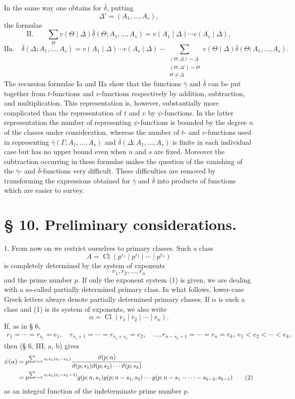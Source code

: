 \documentclass[11pt,a4paper]{article}
\newcommand{\Cl}{\operatorname{Cl}}
\begin{document}
In the same way one obtains for $\bar\delta$, putting
\[
 \Delta'=(A_1,\ldots,A_s),
\]
the formulae
\[
\text{II.}\qquad
 \sum_{\Theta}v(\Theta\mid\Delta)\bar\delta(\Theta;A_1,\ldots,A_s)
 =v(A_1\mid\Delta)\cdots v(A_s\mid\Delta),
\]
\[
\text{IIa.}\quad
 \bar\delta(\Delta;A_1,\ldots,A_s)=v(A_1\mid\Delta)\cdots v(A_s\mid\Delta)
 -\sum_{\substack{(\Theta,\Delta)=\Delta\\(\Theta,\Delta')=\Theta\\\Theta\ne\Delta}}
 v(\Theta\mid\Delta)\bar\delta(\Theta;A_1,\ldots,A_s).
\]
The recursion formulae Ia and IIa show that the functions $\bar\gamma$ and $\bar\delta$ can be put together from $t$-functions and $v$-functions respectively by addition, subtraction, and multiplication. This representation is, however, substantially more complicated than the representation of $t$ and $v$ by $\psi$-functions. In the latter representation the number of representing $\psi$-functions is bounded by the degree $n$ of the classes under consideration, whereas the number of $t$- and $v$-functions used in representing $\bar\gamma(\Gamma;A_1,\ldots,A_s)$ and $\bar\delta(\Delta;A_1,\ldots,A_s)$ is finite in each individual case but has no upper bound even when $n$ and $s$ are fixed. Moreover the subtraction occurring in these formulae makes the question of the vanishing of the $\bar\gamma$- and $\bar\delta$-functions very difficult. These difficulties are removed by transforming the expressions obtained for $\bar\gamma$ and $\bar\delta$ into products of functions which are easier to survey.

\section*{§ 10. Preliminary considerations.}

1. From now on we restrict ourselves to primary classes. Such a class
\[
 A=\Cl(p^{r_1}\mid p^{r_2}\mid\cdots\mid p^{r_n})
\]
is completely determined by the system of exponents
\begin{equation}
 r_1,r_2,\ldots,r_n
\tag{1}
\end{equation}
and the prime number $p$. If only the exponent system (1) is given, we are dealing with a so-called partially determined primary class. In what follows, lower-case Greek letters always denote partially determined primary classes. If $\alpha$ is such a class and (1) is its system of exponents, we also write
\[
 \alpha=\Cl(r_1\mid r_2\mid\cdots\mid r_n).
\]
If, as in § 6,
\[
\begin{gathered}
 r_1=\cdots=r_{s_1}=e_1,
 \quad r_{s_1+1}=\cdots=r_{s_1+s_2}=e_2,
 \quad \ldots,
 r_{n-s_k+1}=\cdots=r_n=e_k,\
 e_1<e_2<\cdots<e_k,
\end{gathered}
\]
then (§ 6, III; a, b) gives
\begin{align}
\psi(\alpha)
&=p^{\sum_{i>h}s_i s_h(e_i-e_h)}
 {\vartheta(p;n)\over \vartheta(p;s_1)\vartheta(p;s_2)\cdots\vartheta(p;s_k)} \notag\\
&=p^{\sum_{i>h}s_i s_h(e_i-e_h-1)}
 g(p;n,s_1)g(p;n-s_1,s_2)\cdots
 g(p;n-s_1-\cdots-s_{k-2},s_{k-1})
\tag{2}
\end{align}
as an integral function of the indeterminate prime number $p$.
\end{document}
